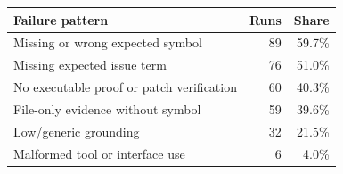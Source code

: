 \begin{tabular}{@{}lrr@{}}
\toprule
Failure pattern & Runs & Share \\
\midrule
Missing or wrong expected symbol & 89 & 59.7\% \\
Missing expected issue term & 76 & 51.0\% \\
No executable proof or patch verification & 60 & 40.3\% \\
File-only evidence without symbol & 59 & 39.6\% \\
Low/generic grounding & 32 & 21.5\% \\
Malformed tool or interface use & 6 & 4.0\% \\
\bottomrule
\end{tabular}
